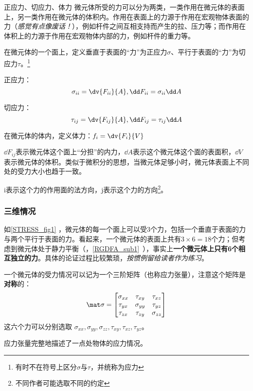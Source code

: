 \begin{definition}{正应力、切应力、体力}
微元体所受的力可以分为两类，一类作用在微元体的表面上，另一类作用在微元体的体积内。作用在表面上的力源于作用在宏观物体表面的力（\textsl{感觉有点像废话！}），例如杆件之间互相支持而产生的拉、压力等；而作用在体积上的力源于作用在宏观物体内部的力，例如杆件的重力等。

在微元体的一个面上，定义垂直于表面的“力”为正应力$\sigma$、平行于表面的“力”为切应力$\tau$。\footnote{有时不在符号上区分$\sigma$与$\tau$，并统称为应力}

正应力：$$\sigma_{ii} =\dv{F_{ii}}{A}, \dd F_{ii} = \sigma_{ii} \dd A$$

切应力：$$\tau_{ij}=\dv{F_{ij}}{A}, \dd F_{ij} = \tau_{ij} \dd A$$

在微元体的体内，定义体力：$f_i = \dv{F_i}{V}$

$\dd F_{ij}$表示微元体这个面上“分担”的内力，$\dd A$表示这个微元体这个面的表面积，$\dd V$表示微元体的体积。类似于微积分的思想，当微元体足够小时，微元体表面上不同处的受力大小也趋于一致。

i表示这个力的作用面的法方向，j表示这个力的方向\footnote{不同作者可能选取不同的约定}。
\end{definition}

\subsubsection{三维情况}
如\autoref{STRESS_fig1} ，微元体的每一个面上可以受$3$个力，包括一个垂直于表面的力与两个平行于表面的力。看起来，一个微元体的表面上共有$3\times6=18$个力；但考虑到微元体处于静力平衡（，\autoref{RGDFA_sub1}~），事实上\textbf{一个微元体上只有6个相互独立的力}。具体的论证过程比较繁琐，\textsl{按惯例留给读者作为练习}。

一个微元体的受力情况可以记为一个三阶矩阵（也称应力张量），注意这个矩阵是\textbf{对称}的：
\begin{equation}
\mat \sigma=
\begin{bmatrix}
\sigma_{xx} & \tau_{xy} & \tau_{xz} \\
\tau_{yx} & \sigma_{yy} & \tau_{yz} \\
\tau_{zx} & \tau_{zy} & \sigma_{zz} \\
\end{bmatrix}
\end{equation}
这六个力可以分别选取 $\sigma_{xx}, \sigma_{yy},\sigma_{zz}, \tau_{xy}, \tau_{xz},  \tau_{yz}$。

应力张量完整地描述了一点处物体的应力情况。

